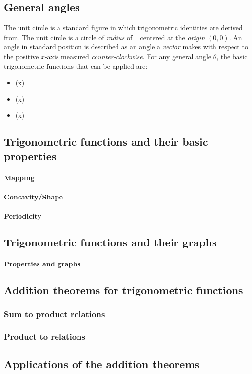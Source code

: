 \subsection{General angles}

The unit circle is a standard figure in which trigonometric identities are derived from.
The unit circle is a circle of \emph{radius} of $1$ centered at the \emph{origin} $(0, 0)$.
An angle in standard position is described as an angle a \emph{vector} makes with respect to the positive $x$-axis measured \emph{counter-clockwise}.
For any general angle $\theta$, the basic trigonometric functions that can be applied are:

\begin{itemize}
  \item \sin(x)
  \item \cos(x)
  \item \tan(x)
\end{itemize}

\subsection{Trigonometric functions and their basic properties}

\paragraph{Mapping}

\paragraph{Concavity/Shape}

\paragraph{Periodicity}

\subsection{Trigonometric functions and their graphs}

\paragraph{Properties and graphs}

\subsection{Addition theorems for trigonometric functions}

\subsubsection{Sum to product relations}

\subsubsection{Product to relations}

\subsection{Applications of the addition theorems}
